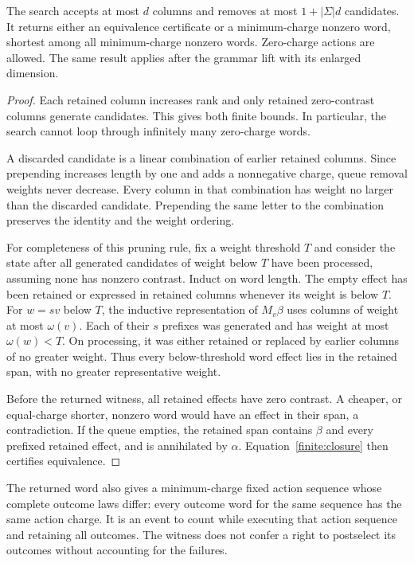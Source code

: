 \begin{theorem}\label{finite:cost}
The search accepts at most $d$ columns and removes at most
$1+|\Sigma|d$ candidates. It returns either an equivalence certificate or
a minimum-charge nonzero word, shortest among all minimum-charge nonzero
words. Zero-charge actions are allowed. The same result applies after
the grammar lift with its enlarged dimension.
\end{theorem}
\begin{proof}
Each retained column increases rank and only retained zero-contrast columns
generate candidates. This gives both finite bounds. In particular, the
search cannot loop through infinitely many zero-charge words.

A discarded candidate is a linear combination of earlier retained
columns. Since prepending increases length by one and adds a nonnegative
charge, queue removal weights never decrease. Every column in that
combination has weight no larger than the discarded candidate. Prepending
the same letter to the combination preserves the identity and the weight
ordering.

For completeness of this pruning rule, fix a weight threshold $T$ and
consider the state after all generated candidates of weight below $T$
have been processed, assuming none has nonzero contrast. Induct on word
length. The empty effect has been retained or expressed in retained
columns whenever its weight is below $T$. For $w=sv$ below $T$, the
inductive representation of $M_v\beta$ uses columns of weight at most
$\omega(v)$. Each of their $s$ prefixes was generated and has weight at
most $\omega(w)<T$. On processing, it was either retained or replaced by
earlier columns of no greater weight. Thus every below-threshold word
effect lies in the retained span, with no greater representative weight.

Before the returned witness, all retained effects have zero contrast. A
cheaper, or equal-charge shorter, nonzero word would have an effect in
their span, a contradiction. If the queue empties, the retained span
contains $\beta$ and every prefixed retained effect, and is annihilated
by $\alpha$. Equation~\eqref{finite:closure} then certifies equivalence.
\end{proof}

The returned word also gives a minimum-charge fixed action sequence whose
complete outcome laws differ: every outcome word for the same sequence has
the same action charge. It is an event to count while executing that action
sequence and retaining all outcomes. The witness does not confer a right
to postselect its outcomes without accounting for the failures.

